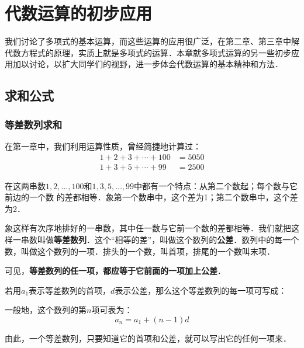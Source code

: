 \chapter{代数运算的初步应用}

我们讨论了多项式的基本运算，而这些运算的应用很广泛，在第二章、第三章中解代数方程式的原理，实质上就是多项式的运算．本章就多项式运算的另一些初步应用加以讨论，以扩大同学们的视野，进一步体会代数运算的基本精神和方法．
\section{求和公式}
\subsection{等差数列求和}
在第一章中，我们利用运算性质，曾经简捷地计算过：
\[\begin{split}
    1+2+3+\cdots+100&=5050\\
    1+3+5+\cdots+99&=2500
\end{split}\]

在这两串数$1, 2,\ldots,100$和$1, 3, 5,\ldots,99$中都有一个特点：从第二个数起；每个数与它前边的一个数
的差都相等．象第一个数串中，这个差为1；第二个数串中，这个差为2．

象这样有次序地排好的一串数，其中任一数与它前一个数的差都相等．我们就把这样一串数叫做\textbf{等差数列}．这个“相等的差”，叫做这个数列的\textbf{公差}．数列中的每一个数，叫做这个数列的一项．排头的一个数，叫首项，排尾的一个数叫末项．

可见，\textbf{等差数列的任一项，都应等于它前面的一项加上公差}．

若用$a_1$表示等差数列的首项，$d$表示公差，那么这个等差数列的每一项可写成：
\begin{center}
\end{center}

一般地，这个数列的第$n$项可表为：
\[a_n=a_1+ (n-1) d\]

由此，一个等差数列，只要知道它的首项和公差，就可以写出它的任何一项来．

